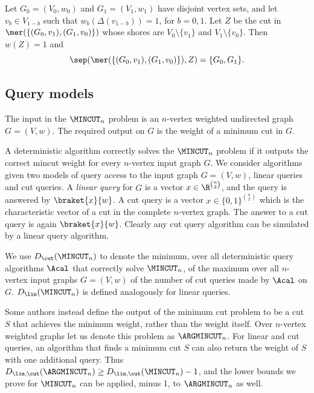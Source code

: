 \begin{claim}
\label{claim:sepmer}
Let $G_0= (V_0, w_0)$ and $ G_1 = (V_1,w_1)$ have disjoint vertex sets, and let $v_b \in V_{1-b}$ such that
$w_b(\Delta(v_{1-b})) =1$,
for $b=0,1$. Let $Z$ be the cut in $\mer( \{ (G_0, v_1), (G_1, v_0) \} )$ whose shores are
$V_0  \setminus \{v_1\}$ and $V_1 \setminus \{v_0\}$. Then $w(Z)=1$ and
$$
\sep ( \mer( \{ (G_0, v_1), (G_1, v_0) \} ), Z ) = \{ G_0, G_1 \}.
$$
\end{claim}

\subsection{Query models}
\begin{definition}[$\MINCUT_n$]
The input in the $\MINCUT_n$ problem is an $n$-vertex weighted undirected graph $G = (V,w)$.  The required output on $G$ is the weight
of a minimum cut in $G$.
\end{definition}
A deterministic algorithm correctly solves the $\MINCUT_n$ problem if it outputs the correct mincut weight for every $n$-vertex input graph $G$.
We consider algorithms given two models of query access to the input graph $G = (V,w)$, linear queries and cut queries.
A {\em linear query} for $G$ is a vector $x \in \R^{\binom{n}{2}}$,
and the query is answered by $\braket{x}{w}$.  A cut query is a vector $x \in \{0,1\}^{\binom{n}{2}}$
which is the characteristic vector of a cut in the complete $n$-vertex graph.  The answer
to a cut query is again $\braket{x}{w}$.  Clearly any cut query algorithm can be simulated by a linear
query algorithm.

We use $D_\cut(\MINCUT_n)$ to denote the minimum, over all deterministic query algorithms $\Acal$ that correctly solve $\MINCUT_n$,
of the maximum over all $n$-vertex input graphs $G = (V,w)$ of the number of cut queries made by $\Acal$ on $G$.
$D_\lin(\MINCUT_n)$ is defined analogously for linear queries.

Some authors instead define the output of the minimum cut problem to be a cut $S$ that achieves the minimum weight, rather than the weight itself.  Over $n$-vertex weighted
graphs let us denote this problem as $\ARGMINCUT_n$.  For linear and cut queries, an algorithm that finds a minimum cut $S$ can also return the weight of $S$ with one additional query.
Thus $D_{\lin, \cut}(\ARGMINCUT_n) \ge D_{\lin, \cut}(\MINCUT_n) - 1$, and the lower bounds we prove for $\MINCUT_n$ can be applied, minus 1, to $\ARGMINCUT_n$ as well.

